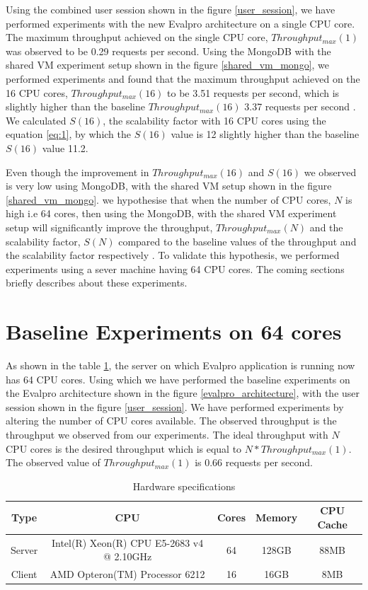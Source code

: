 \documentclass[sigconf]{acmart}
\begin{document}
Using the combined user session shown in the figure \ref{user_session}, we have performed experiments with the new Evalpro architecture on a single CPU core. The maximum throughput achieved on the single CPU core, $Throughput_{max}(1)$ was observed to be 0.29 requests per second. Using the MongoDB with the shared VM experiment setup shown in the figure \ref{shared_vm_mongo}, we performed experiments and found that the maximum throughput achieved on the 16 CPU cores, $Throughput_{max}(16)$ to be 3.51 requests per second, which is slightly higher than the baseline $Throughput_{max}(16)$ 3.37 requests per second . We calculated $S(16)$, the scalability factor with 16 CPU cores using the equation \ref{eq:1}, by which the $S(16)$ value is 12  slightly higher than the baseline $S(16)$ value 11.2.

Even though the improvement in  $Throughput_{max}(16)$ and $S(16)$  we observed is very low using MongoDB, with the shared VM setup shown in the figure \ref{shared_vm_mongo}. we hypothesise that when the number of CPU cores, $N$ is high i.e 64 cores, then  using the MongoDB, with the shared VM experiment setup will significantly improve the throughput, $Throughput_{max}(N)$ and  the scalability factor, $S(N)$ compared to the baseline values of the throughput and the scalability factor respectively . To validate this hypothesis, we performed experiments using a sever machine having 64 CPU cores. The coming sections briefly describes about these experiments.

\section{Baseline Experiments on 64 cores}\label{baseline_64}
As shown in the table \ref{tab:hardware_64_cores}, the server on which Evalpro application is running now has 64 CPU cores. Using which we have performed the baseline experiments on the Evalpro architecture shown in the figure \ref{evalpro_architecture}, with the user session shown in the figure \ref{user_session}. We have performed experiments by altering the number of CPU cores available. The observed throughput is the throughput we observed from our experiments. The ideal throughput with $N$ CPU cores is the desired throughput which is equal to $N*Throughput_{max}(1)$. The observed value of $Throughput_{max}(1)$ is 0.66 requests per second.

\begin{table}[!htb]
  \begin{tabular}{ccccc}
    \toprule
    Type&CPU&Cores&Memory&CPU Cache\\
    \midrule
    Server & Intel(R) Xeon(R) CPU E5-2683 v4 @ 2.10GHz& 64&128GB&88MB\\
    Client & AMD Opteron(TM) Processor 6212 & 16&16GB&8MB\\
  \bottomrule
\end{tabular}
\caption{Hardware specifications}
  \label{tab:hardware_64_cores}
\end{table}
\end{document}
